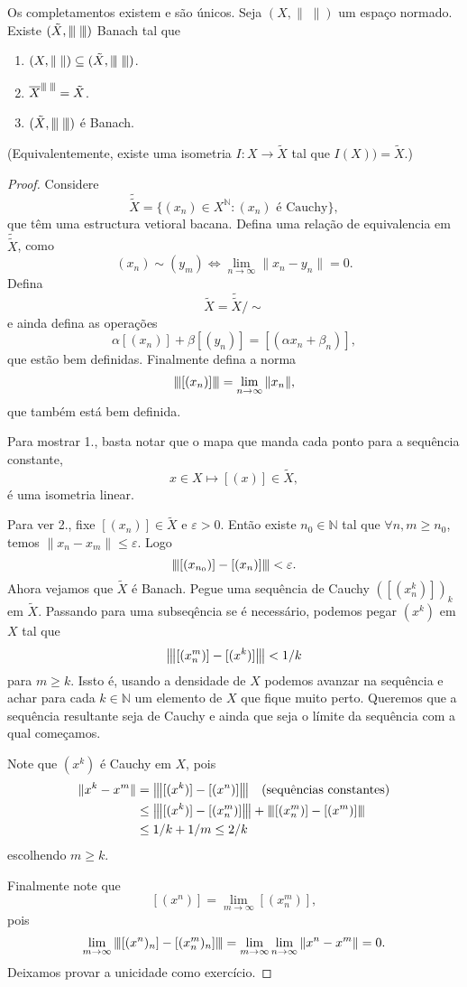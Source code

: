 \documentclass[portuguese]{article}
\theoremstyle{definition}
\newcommand{\N}{\mathbb{N}}
\newcommand{\vertiii}[1]{{\left\vert\kern-0.25ex\left\vert\kern-0.25ex\left\vert #1 
		\right\vert\kern-0.25ex\right\vert\kern-0.25ex\right\vert}}
\begin{document}
	\begin{teo}
		Os completamentos existem e são únicos. Seja $(X,\|\;\|)$ um espaço normado. Existe $(\tilde{X},\vertiii{\;})$ Banach tal que
		\begin{enumerate}
			\item $(X,\|\;\|)\subseteq(\tilde{X},\vertiii{\;})$.
			\item $\overline{X}^{\vertiii{\;}}=\tilde{X}$.
			\item $(\tilde{X},\vertiii{\;})$ é Banach.
		\end{enumerate}
		(Equivalentemente, existe uma isometria $I:X\to\tilde{X}$ tal que $I(X))=\tilde{X}$.)
	\end{teo}
	\begin{proof}
		Considere
		\[\tilde{\tilde{X}}=\{(x_n)\in X^\N:(x_n)\text{ é Cauchy}\},\]
		que têm uma estructura vetioral bacana. Defina uma relação de equivalencia em $\tilde{\tilde{X}}$, como
		\[(x_n)\sim(y_m)\iff\lim_{n\to\infty}\| x_n-y_n\|=0.\]
		Defina
		\[\tilde{X}=\tilde{\tilde{X}}/\sim\]
		e ainda defina as operações
		\[\alpha[(x_n)]+\beta[(y_n)]=[(\alpha x_n+\beta_n)],\]
		que estão bem definidas. Finalmente defina a norma
		\[\vertiii{[(x_n)]}=\lim_{n\to\infty}\| x_n\|,\]
		que também está bem definida.
		
		Para mostrar 1., basta notar que o mapa que manda cada ponto para a sequência constante,
		\[x\in X\mapsto [(x)]\in\tilde{X},\]
		é uma isometria linear.
		
		Para ver 2., fixe $[(x_n)]\in\tilde{X}$ e $\varepsilon>0$. Então existe $n_0\in\N$ tal que $\forall n,m\geq n_0$, temos $\| x_n-x_m\|\leq\varepsilon$. Logo
		\[\vertiii{[(x_{n_0})]-[(x_n)]}<\varepsilon.\]
		Ahora vejamos que $\tilde{X}$ é Banach. Pegue uma sequência de Cauchy $([(x^k_n)])_k$ em $\tilde{X}$. Passando para uma subseqência se é necessário, podemos pegar $(x^k)$ em $X$ tal que
		\[\vertiii{[(x^m_n)]-[(x^k)]}<1/k\]
		para $m\geq k$. Issto é, usando a densidade de $X$ podemos avanzar na sequência e achar para cada $k\in\N$ um elemento de $X$ que fique muito perto. Queremos que a sequência resultante seja de Cauchy e ainda que seja o límite da sequência com a qual começamos.
		
		Note que $(x^k)$ é Cauchy em $X$, pois
		\begin{align*}
			\| x^k-x^m\|&=\vertiii{[(x^k)]-[(x^n)]}\quad\text{(sequências constantes)}\\
			&\leq\vertiii{[(x^k)]-[(x^m_n)]}+\vertiii{[(x^m_n)]-[(x^m)]}\\
			&\leq 1/k+1/m\leq 2/k
		\end{align*}
		escolhendo $m\geq k$.
		
		Finalmente note que
		\[[(x^n)]=\lim_{m\to\infty}[(x^m_n)],\]
		pois
		\begin{align*}
			\lim_{m\to\infty}\vertiii{[(x^n)_n]-[(x^m_n)_n]}=\lim_{m\to\infty}\lim_{n\to\infty}\| x^n-x^m\|=0.
		\end{align*}
		Deixamos provar a unicidade como exercício.
	\end{proof}
	
\end{document}
